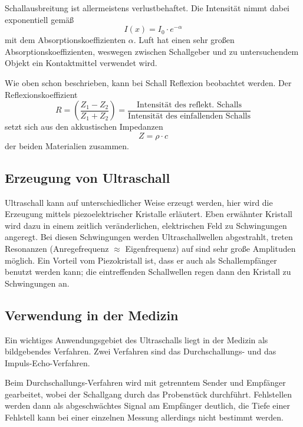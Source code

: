 \noindent
Schallausbreitung ist allermeistens verlustbehaftet. Die Intensität nimmt dabei exponentiell gemäß
\begin{equation}
	I(x) = I_0 \cdot e^{-\alpha}
\end{equation}
mit dem Absorptionskoeffizienten $\alpha$. Luft hat einen sehr großen Absorptionskoeffizienten, weswegen 
zwischen Schallgeber und zu untersuchendem Objekt ein Kontaktmittel verwendet wird.

\noindent
Wie oben schon beschrieben, kann bei Schall Reflexion beobachtet werden. Der Reflexionskoeffizient
\begin{equation}
	R = \left(\frac{Z_1 - Z_2}{Z_1 + Z_2} \right) 
	= \frac{\text{Intensität des reflekt. Schalls}}{\text{Intensität des einfallenden Schalls}}
\end{equation}
setzt sich aus den akkustischen Impedanzen 
\begin{equation}
	\label{eqn:impedanz}
	Z = \rho \cdot c
\end{equation}
der beiden Materialien zusammen.

\subsection{Erzeugung von Ultraschall}
\label{sec:Erzeugung von Ultraschall}

Ultraschall kann auf unterschiedlicher Weise erzeugt werden, hier wird die Erzeugung mittels
piezoelektrischer Kristalle erläutert. Eben erwähnter Kristall wird dazu in einem zeitlich
veränderlichen, elektrischen Feld zu Schwingungen angeregt. Bei diesen Schwingungen werden
Ultraschallwellen abgestrahlt, treten Resonanzen (Anregefrequenz $\approx$ Eigenfrequenz) auf sind
sehr große Amplituden möglich.  Ein Vorteil vom Piezokristall ist, dass er auch als Schallempfänger
benutzt werden kann; die eintreffenden Schallwellen regen dann den Kristall zu Schwingungen an.

\subsection{Verwendung in der Medizin}
\label{sec:Verwendung in der Medizin}

Ein wichtiges Anwendungsgebiet des Ultraschalls liegt in der Medizin als bildgebendes Verfahren.
Zwei Verfahren sind das Durchschallungs- und das Impuls-Echo-Verfahren.

Beim Durchschallungs-Verfahren wird mit getrenntem Sender und Empfänger gearbeitet, wobei der
Schallgang durch das Probenstück durchführt. Fehlstellen werden dann als abgeschwächtes Signal am
Empfänger deutlich, die Tiefe einer Fehlstell kann bei einer einzelnen Messung allerdings nicht
bestimmt werden.

